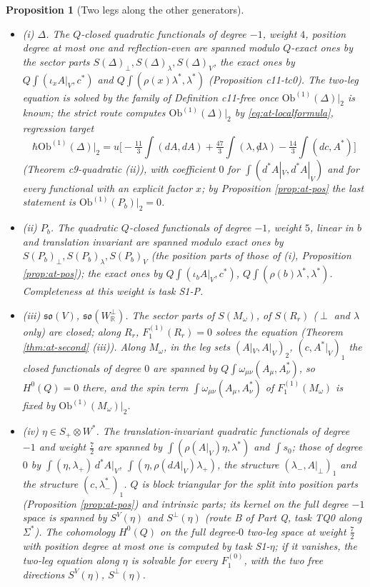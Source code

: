 \documentclass[11pt]{article}
\numberwithin{equation}{section}
\theoremstyle{plain}
\newtheorem{proposition}[theorem]{Proposition}
\theoremstyle{definition}
\newcommand{\Ap}{A|_{\perp}}
\newcommand{\AV}{A|_V}
\newcommand{\Ob}{\mathrm{Ob}}
\newcommand{\dslash}{{\not d}}
\begin{document}
\begin{proposition}[Two legs along the other generators]
\label{prop:at-two}
\leavevmode
\begin{itemize}
\item (i) $\Delta$. The $Q$-closed quadratic functionals of degree $-1$, weight $4$, position degree at most one and reflection-even are spanned modulo $Q$-exact ones by the sector parts $S(\Delta)_\perp,S(\Delta)_\lambda,S(\Delta)_V$, the exact ones by $Q\int(\iota_x\AV,c^*)$ and $Q\int(\rho(x)\lambda^*,\lambda^*)$ (Proposition c11-tc0). The two-leg equation is solved by the family of Definition c11-free once $\Ob^{(1)}(\Delta)|_2$ is known; the strict route computes $\Ob^{(1)}(\Delta)|_2$ by \eqref{eq:at-localformula}, regression target
\begin{equation}
\hbar\Ob^{(1)}(\Delta)\big|_2=u\Big[-\tfrac{11}3\int(dA,dA)+\tfrac{47}3\int(\lambda,\dslash\lambda)-\tfrac{14}3\int(dc,A^*)\Big]
\label{eq:at-reg2}
\end{equation}
(Theorem c9-quadratic (ii)), with coefficient $0$ for $\int(d^*\AV,d^*\AV)$ and for every functional with an explicit factor $x$; by Proposition \ref{prop:at-pos} the last statement is $\Ob^{(1)}(P_b)|_2=0$.
\item (ii) $P_b$. The quadratic $Q$-closed functionals of degree $-1$, weight $5$, linear in $b$ and translation invariant are spanned modulo exact ones by $S(P_b)_\perp,S(P_b)_\lambda,S(P_b)_V$ (the position parts of those of (i), Proposition \ref{prop:at-pos}); the exact ones by $Q\int(\iota_b\AV,c^*)$, $Q\int(\rho(b)\lambda^*,\lambda^*)$. Completeness at this weight is task S1-P.
\item (iii) $\mathfrak{so}(V)$, $\mathfrak{so}(W^\perp_{\mathbb R})$. The sector parts of $S(M_\omega)$, of $S(R_r)$ ($\perp$ and $\lambda$ only) are closed; along $R_r$, $F_1^{(1)}(R_r)=0$ solves the equation (Theorem \ref{thm:at-second} (iii)). Along $M_\omega$, in the leg sets $(\AV,\AV)_2$, $(c,A^*|_V)_1$ the closed functionals of degree $0$ are spanned by $Q\int\omega_{\mu\nu}(A_\mu,A^*_\nu)$, so $H^0(Q)=0$ there, and the spin term $\int\omega_{\mu\nu}(A_\mu,A^*_\nu)$ of $F_1^{(1)}(M_\omega)$ is fixed by $\Ob^{(1)}(M_\omega)|_2$.
\item (iv) $\eta\in S_+\otimes W^*$. The translation-invariant quadratic functionals of degree $-1$ and weight $\tfrac72$ are spanned by $\int(\rho(\AV)\eta,\lambda^*)$ and $\int s_0$; those of degree $0$ by $\int(\eta,\lambda_+)\,d^*\AV$, $\int(\eta,\rho(d\AV)\lambda_+)$, the structure $(\lambda_-,\Ap)_1$ and the structure $(c,\lambda^*_-)_1$. $Q$ is block triangular for the split into position parts (Proposition \ref{prop:at-pos}) and intrinsic parts; its kernel on the full degree $-1$ space is spanned by $S^V(\eta)$ and $S^\perp(\eta)$ (route B of Part Q, task TQ0 along $\Sigma^*$). The cohomology $H^0(Q)$ on the full degree-$0$ two-leg space at weight $\tfrac72$ with position degree at most one is computed by task S1-$\eta$; if it vanishes, the two-leg equation along $\eta$ is solvable for every $F_1^{(0)}$, with the two free directions $S^V(\eta)$, $S^\perp(\eta)$.

\end{itemize}
\end{proposition}
\end{document}

